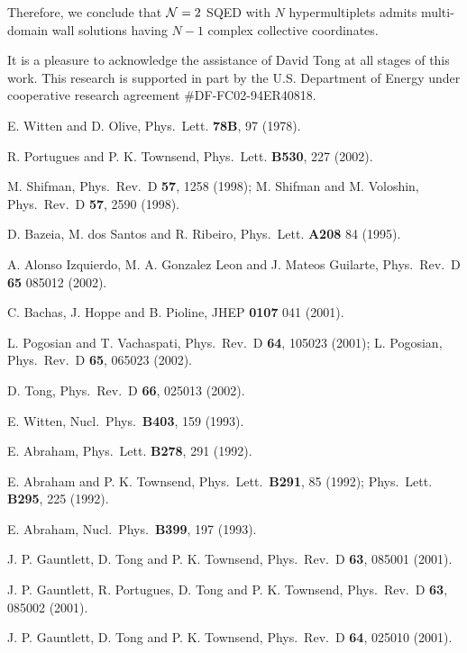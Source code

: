\documentclass[a4paper,preprint,preprintnumbers,amsmath,amssymb]{revtex4}
\begin{document}
\medskip


Therefore, we conclude that ${\cal N}=2$ SQED with $N$ hypermultiplets 
admits multi-domain wall solutions having $N-1$ complex collective coordinates. 



\acknowledgments
 It is a pleasure to acknowledge the assistance of David Tong
 at all stages of this work.
 This research is supported in part by the U.S. Department of Energy 
 under cooperative research agreement \#DF-FC02-94ER40818.  


\begin{thebibliography}{99} 

E. Witten and D. Olive, Phys.\ Lett. {\bf 78B}, 97 (1978).

R. Portugues and P. K. Townsend, Phys.\ Lett. {\bf B530}, 227 (2002).

M. Shifman, Phys.\ Rev.\ D {\bf 57}, 1258 (1998);
M. Shifman and M. Voloshin,  Phys.\ Rev.\ D {\bf 57}, 2590 (1998).

D. Bazeia, M. dos Santos and R. Ribeiro,  Phys.\ Lett. {\bf A208} 84 (1995).

A. Alonso Izquierdo, M. A. Gonzalez Leon and J. Mateos Guilarte,
Phys.\ Rev.\ D  {\bf 65} 085012 (2002).

C. Bachas, J. Hoppe and B. Pioline, JHEP {\bf 0107} 041 (2001).
 
L. Pogosian and T. Vachaspati, Phys.\ Rev.\ D {\bf 64}, 105023 (2001);
L. Pogosian,  Phys.\ Rev.\ D {\bf 65}, 065023 (2002). 

D. Tong,  Phys.\ Rev.\ D {\bf 66}, 025013 (2002).

E. Witten, Nucl.\ Phys.\ {\bf B403}, 159 (1993).

E. Abraham, Phys.\ Lett. {\bf B278}, 291 (1992). 

E. Abraham and P. K. Townsend, Phys.\ Lett.\ {\bf B291}, 85 (1992);
 Phys.\ Lett. {\bf B295}, 225 (1992).

E. Abraham, Nucl.\ Phys.\ {\bf B399}, 197 (1993).

J. P. Gauntlett, D. Tong and P. K. Townsend,
Phys.\ Rev.\ D {\bf 63}, 085001 (2001).

J. P. Gauntlett, R. Portugues, D. Tong and P. K. Townsend,
Phys.\ Rev.\ D {\bf 63}, 085002 (2001).

J. P. Gauntlett, D. Tong and P. K. Townsend,  
Phys.\ Rev.\ D {\bf 64}, 025010 (2001).


\end{thebibliography}
\end{document}
